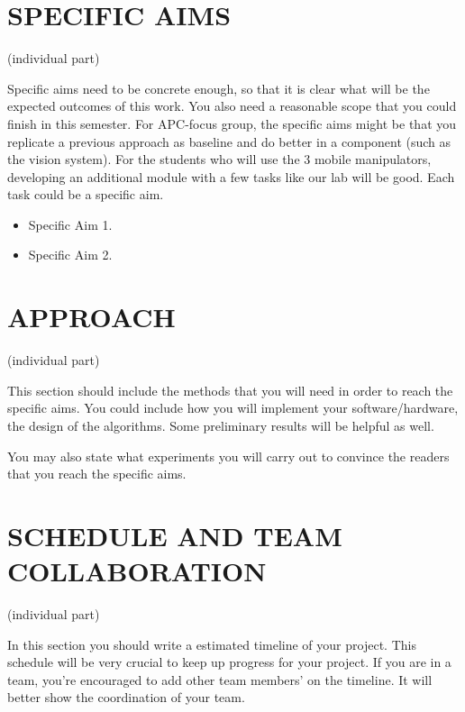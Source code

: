 \documentclass[letterpaper, 10 pt, conference]{ieeeconf}  %
\begin{document}
\section{SPECIFIC AIMS}

(individual part)

Specific aims need to be concrete enough, so that it is clear what will be the expected outcomes of this work. You also need a reasonable scope that you could finish in this semester. For APC-focus group, the specific aims might be that you replicate a previous approach as baseline and do better in a component (such as the vision system). For the students who will use the 3 mobile manipulators, developing an additional module with a few tasks like our lab will be good. Each task could be a specific aim.

\begin{itemize}
\item Specific Aim 1.
\item Specific Aim 2.
\end{itemize}

\section{APPROACH}

(individual part)

This section should include the methods that you will need in order to reach the specific aims. You could include how you will implement your software/hardware, the design of the algorithms. Some preliminary results will be helpful as well. 

You may also state what experiments you will carry out to convince the readers that you reach the specific aims.

\section{SCHEDULE AND TEAM COLLABORATION}

(individual part)

In this section you should write a estimated timeline of your project. This schedule will be very crucial to keep up progress for your project. If you are in a team, you're encouraged to add other team members' on the timeline. It will better show the coordination of your team.
   

\addtolength{\textheight}{-12cm}   %



\end{document}
